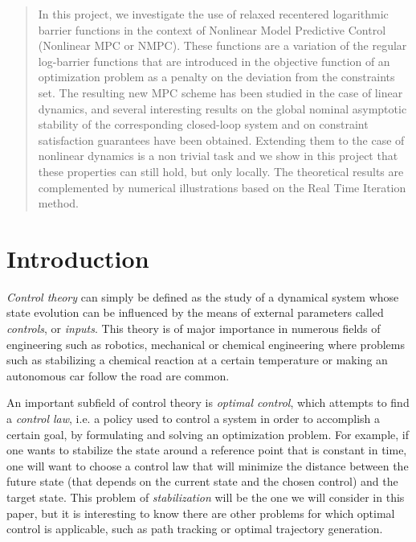 \documentclass[12pt]{article}
\begin{document}


\clearpage
\thispagestyle{empty}
\begin{abstract}
	In this project, we investigate the use of relaxed recentered logarithmic barrier functions in the context of Nonlinear Model Predictive Control (Nonlinear MPC or NMPC).
	These functions are a variation of the regular log-barrier functions that are introduced in the objective function of an optimization problem as a penalty on the deviation from the constraints set.
	The resulting new MPC scheme has been studied in the case of linear dynamics, and several interesting results on the global nominal asymptotic stability of the corresponding closed-loop system and on constraint satisfaction guarantees have been obtained.
	Extending them to the case of nonlinear dynamics is a non trivial task and we show in this project that these properties can still hold, but only locally.
	The theoretical results are complemented by numerical illustrations based on the Real Time Iteration method.
\end{abstract}

\clearpage
\thispagestyle{empty}
\tableofcontents

\clearpage
{}
\setcounter{page}{1}


\section{Introduction}
\textit{Control theory} can simply be defined as the study of a dynamical system whose state evolution can be influenced by the means of external parameters called \textit{controls}, or \textit{inputs}.
This theory is of major importance in numerous fields of engineering such as robotics, mechanical or chemical engineering where problems such as stabilizing a chemical reaction at a certain temperature or making an autonomous car follow the road are common.

An important subfield of control theory is \textit{optimal control}, which attempts to find a \textit{control law}, i.e. a policy used to control a system in order to accomplish a certain goal, by formulating and solving an optimization problem.
For example, if one wants to stabilize the state around a reference point that is constant in time, one will want to choose a control law that will minimize the distance between the future state (that depends on the current state and the chosen control) and the target state.
This problem of \textit{stabilization} will be the one we will consider in this paper, but it is interesting to know there are other problems for which optimal control is applicable, such as path tracking or optimal trajectory generation.
\end{document}

